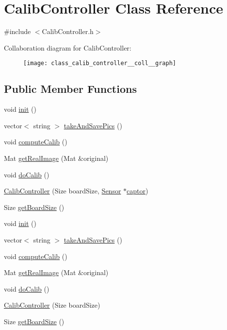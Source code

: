 \hypertarget{class_calib_controller}{\section{Calib\-Controller Class Reference}
\label{class_calib_controller}
}


{\ttfamily \#include $<$Calib\-Controller.\-h$>$}



Collaboration diagram for Calib\-Controller\-:\nopagebreak
\begin{figure}[H]
\begin{center}
\leavevmode
\texttt{[image: class\_calib\_controller\_\_coll\_\_graph]}
\end{center}
\end{figure}
\subsection*{Public Member Functions}
\begin{DoxyCompactItemize}
\item 
void \hyperlink{class_calib_controller_a40eb2511d1666b5fc105b5d3018f8976}{init} ()
\item 
vector$<$ string $>$ \hyperlink{class_calib_controller_afeb31602e51c3a6e1206f8dd27f85ca2}{take\-And\-Save\-Pics} ()
\item 
void \hyperlink{class_calib_controller_a1e4505d8fd2f7ce275fec12a10e1c591}{compute\-Calib} ()
\item 
Mat \hyperlink{class_calib_controller_a01093e8a1e478e536dafdba833b24d57}{get\-Real\-Image} (Mat \&original)
\item 
void \hyperlink{class_calib_controller_ab5118d61dbbb24ca2b88713f56666540}{do\-Calib} ()
\item 
\hyperlink{class_calib_controller_a9a77e4bf8ef429ee4738c7d7c7e7be25}{Calib\-Controller} (Size board\-Size, \hyperlink{class_sensor}{Sensor} $\ast$\hyperlink{homography_2main_8cpp_a06102d39198e31579beb0539bff11cd9}{captor})
\item 
Size \hyperlink{class_calib_controller_ad5f91606cb01ac9ee3da9c8dfc90495c}{get\-Board\-Size} ()
\item 
void \hyperlink{class_calib_controller_a40eb2511d1666b5fc105b5d3018f8976}{init} ()
\item 
vector$<$ string $>$ \hyperlink{class_calib_controller_a98f63965152d1f337c55bd1584eb4cb3}{take\-And\-Save\-Pics} ()
\item 
void \hyperlink{class_calib_controller_a1e4505d8fd2f7ce275fec12a10e1c591}{compute\-Calib} ()
\item 
Mat \hyperlink{class_calib_controller_a01093e8a1e478e536dafdba833b24d57}{get\-Real\-Image} (Mat \&original)
\item 
void \hyperlink{class_calib_controller_ab5118d61dbbb24ca2b88713f56666540}{do\-Calib} ()
\item 
\hyperlink{class_calib_controller_a927ad2def953ee2f7f7e6819d73352d7}{Calib\-Controller} (Size board\-Size)
\item 
Size \hyperlink{class_calib_controller_ad5f91606cb01ac9ee3da9c8dfc90495c}{get\-Board\-Size} ()
\end{DoxyCompactItemize}


